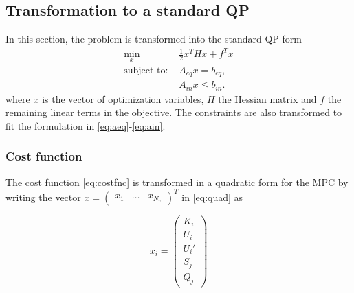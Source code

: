 \documentclass[letterpaper,10pt,conference]{ieeeconf}
\begin{document}
\subsection{Transformation to a standard QP}
In this section, the problem is transformed into the standard QP form
\begin{subequations} \label{stform}
\begin{align}\label{eq:quad}
\min_{x}\; &\frac{1}{2}x^THx+f^Tx\\
\text{subject to: }
&A_{eq}x =b_{eq},\label{eq:aeq}\\
&A_{in}x \leq b_{in}.\label{eq:ain}
\end{align}
\end{subequations}
where $x$ is the vector of optimization variables, $H$ the Hessian matrix and $f$ the remaining linear terms in the objective. The constraints are also transformed to fit the formulation in \eqref{eq:aeq}-\eqref{eq:ain}.
\subsubsection{Cost function}
The cost function \eqref{eq:costfnc} is transformed in a quadratic form for the MPC by writing the vector $x=\begin{pmatrix}x_1&\dots&x_{N_v}  \end{pmatrix}^T$ in \eqref{eq:quad} as


\begin{equation}
x_i=\begin{pmatrix}
K_i \\ U_i\\ U_i' \\ S_j \\ Q_j
\end{pmatrix}
\end{equation}
\end{document}

